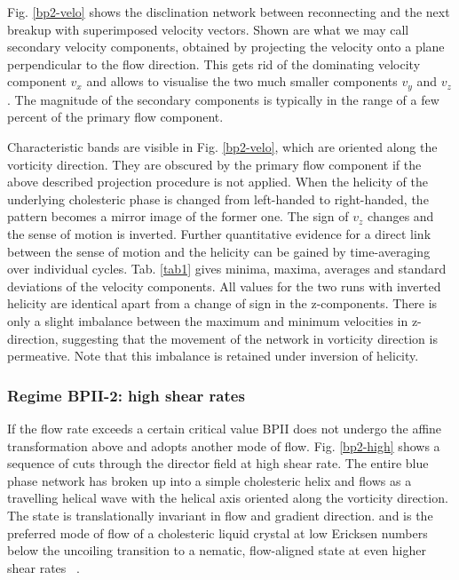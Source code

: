 \documentclass[aps,pre,reprint,superscriptaddress, twocolumn]{revtex4}
\begin{document}
Fig. \ref{bp2-velo} shows the disclination network between reconnecting 
and the next breakup with superimposed velocity vectors.
Shown are what we may call secondary velocity components, obtained by projecting the
velocity onto a plane perpendicular to the flow direction.
This gets rid of the dominating velocity component $v_x$ and 
allows to visualise the two much smaller components $v_y$ and $v_z$.
The magnitude of the secondary components is typically in the range of a 
few percent of the primary flow component.

Characteristic bands are visible in Fig. \ref{bp2-velo}, which are 
oriented along the vorticity direction. They are obscured by the
primary flow component if the above described projection procedure
is not applied.
When the helicity of the underlying cholesteric phase is changed from 
left-handed to right-handed, 
the pattern becomes a mirror image of the former one. The sign of 
$v_z$ changes and the sense of motion is inverted.
Further quantitative evidence for a direct link between the sense of motion 
and the helicity can be gained by time-averaging over individual cycles.
Tab. \ref{tab1} gives minima, maxima, averages and standard deviations 
of the velocity components.
All values for the two runs with inverted helicity are identical apart 
from a change of sign in the z-components.
There is only a slight imbalance between the maximum and minimum velocities 
in z-direction, suggesting that the movement of the network in vorticity 
direction is permeative. Note that this imbalance is retained under inversion of
helicity.

\subsubsection{Regime BPII-2: high shear rates}

If the flow rate exceeds a certain critical value BPII does not undergo the 
affine transformation  above and adopts another mode of flow. 
Fig. \ref{bp2-high} shows a sequence of cuts through the director 
field at high shear rate. The entire blue phase network has broken up 
into a simple cholesteric helix and flows as a travelling 
helical wave with the helical axis oriented along the vorticity direction.
The state is translationally invariant in flow and gradient direction.
and is the preferred mode of flow of a cholesteric 
liquid crystal at low Ericksen numbers below the uncoiling transition 
to a nematic, flow-aligned state at even higher shear rates ~\cite{Rey:1996a, Rey:1996b}.
\end{document}
